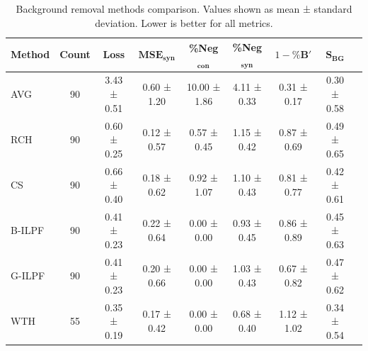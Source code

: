 \documentclass[iucr,review]{iucrjournals}
\begin{document}
\begin{table}[t]
\caption{Background removal methods comparison. Values shown as mean ± standard deviation.
Lower is better for all metrics.}
\label{tab:method_performance}
\centering
\small
\setlength{\tabcolsep}{3pt}
\renewcommand{\arraystretch}{1.1}
\begin{tabular}{@{}lcccccccc@{}}
\toprule
\textbf{Method} & \textbf{Count} & \textbf{Loss} & $\mathbf{MSE}_{\mathbf{syn}}$ & \textbf{\%Neg$_{\mathbf{con}}$} & \textbf{\%Neg$_{\mathbf{syn}}$} & \textbf{$1-\%\mathbf{B}'$} & \textbf{$\mathbf{S}_{\mathbf{BG}}$} \\ \midrule
AVG & 90 & 3.43 ± 0.51 & 0.60 ± 1.20 & 10.00 ± 1.86 & 4.11 ± 0.33 & 0.31 ± 0.17 & 0.30 ± 0.58 \\
RCH & 90 & 0.60 ± 0.25 & 0.12 ± 0.57 & 0.57 ± 0.45 & 1.15 ± 0.42 & 0.87 ± 0.69 & 0.49 ± 0.65 \\
CS & 90 & 0.66 ± 0.40 & 0.18 ± 0.62 & 0.92 ± 1.07 & 1.10 ± 0.43 & 0.81 ± 0.77 & 0.42 ± 0.61 \\
B-ILPF & 90 & 0.41 ± 0.23 & 0.22 ± 0.64 & 0.00 ± 0.00 & 0.93 ± 0.45 & 0.86 ± 0.89 & 0.45 ± 0.63 \\
G-ILPF & 90 & 0.41 ± 0.23 & 0.20 ± 0.66 & 0.00 ± 0.00 & 1.03 ± 0.43 & 0.67 ± 0.82 & 0.47 ± 0.62 \\
WTH & 55 & 0.35 ± 0.19 & 0.17 ± 0.42 & 0.00 ± 0.00 & 0.68 ± 0.40 & 1.12 ± 1.02 & 0.34 ± 0.54 \\

\bottomrule
\end{tabular}
\end{table}
\end{document}
